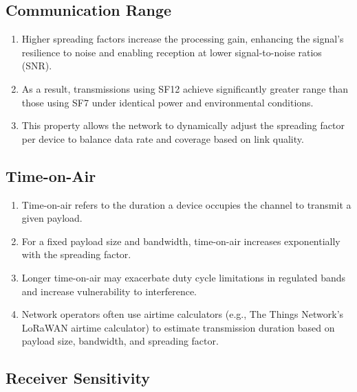 \subsection{Communication Range}

\begin{enumerate}
    \item Higher spreading factors increase the processing gain, enhancing the signal’s resilience to noise and enabling reception at lower signal-to-noise ratios (SNR).
    \item As a result, transmissions using SF12 achieve significantly greater range than those using SF7 under identical power and environmental conditions.
    \item This property allows the network to dynamically adjust the spreading factor per device to balance data rate and coverage based on link quality.
\end{enumerate}

\subsection{Time-on-Air}

\begin{enumerate}
    \item Time-on-air refers to the duration a device occupies the channel to transmit a given payload.
    \item For a fixed payload size and bandwidth, time-on-air increases exponentially with the spreading factor.
    \item Longer time-on-air may exacerbate duty cycle limitations in regulated bands and increase vulnerability to interference.
    \item Network operators often use airtime calculators (e.g., The Things Network’s LoRaWAN airtime calculator) to estimate transmission duration based on payload size, bandwidth, and spreading factor.
\end{enumerate}

\subsection{Receiver Sensitivity}

